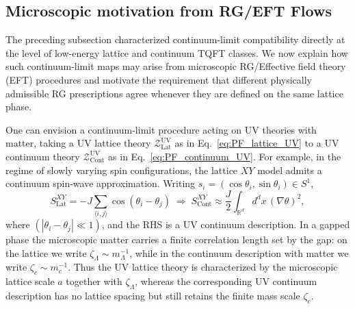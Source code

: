 \documentclass[aps,prx,reprint,superscriptaddress,twocolumn,amsmath,amssymb,amsfonts, nofootinbib]{revtex4-2}
\theoremstyle{apsstyle}
\begin{document}
\subsection{Microscopic motivation from RG/EFT Flows}
\label{sec:RG_flow}

The preceding subsection characterized continuum-limit compatibility directly at the level of low-energy lattice and continuum TQFT classes. We now explain how such continuum-limit maps may arise from microscopic RG/Effective field theory (EFT)  procedures and motivate the requirement that different physically admissible RG prescriptions agree whenever they are defined on the same lattice phase. 

One can envision a continuum-limit procedure acting on UV theories with matter, taking a UV lattice theory $\mathcal{Z}^{\mathrm{UV}}_{\mathrm{Lat}}$ as in Eq.~\eqref{eq:PF_lattice_UV} to a UV continuum theory $\mathcal{Z}^{\mathrm{UV}}_{\mathrm{Cont}}$ as in Eq.~\eqref{eq:PF_continuum_UV}. For example, in the regime of slowly varying spin configurations, the lattice $XY$ model admits a continuum spin-wave approximation. Writing
$s_i=(\cos\theta_i,\sin\theta_i)\in S^1$,
\begin{equation*}
S_{\mathrm{Lat}}^{XY}=-J\sum_{\langle i,j\rangle}\cos(\theta_i-\theta_j)
\;\Rightarrow\;
S_{\mathrm{Cont}}^{XY}\approx \frac{J}{2}\int_{\mathbb{R}^d} d^dx\,(\nabla\theta)^2,
\end{equation*}
where $(|\theta_i-\theta_j|\ll 1)$, and the RHS is a UV continuum description. In a gapped phase the microscopic matter carries a finite correlation length set by the gap: on the lattice we write $\zeta_{\Lambda}\sim m_{\Lambda}^{-1}$, while in the continuum description with matter we write $\zeta_c\sim m_c^{-1}$. Thus the UV lattice theory is characterized by the microscopic lattice scale $a$ together with $\zeta_{\Lambda}$, whereas the corresponding UV continuum description has no lattice spacing but still retains the finite mass scale $\zeta_c$.
\end{document}
